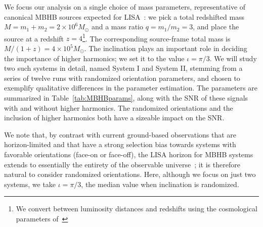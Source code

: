 \documentclass[aps,showpacs,twocolumn,prd,superscriptaddress,nofootinbib]{revtex4-1}
\begin{document}
We focus our analysis on a single choice of mass parameters, representative of canonical MBHB sources expected for LISA~\cite{Barausse12, Klein+15, LISA2017}: we pick a total redshifted mass $M=m_{1}+m_{2} = 2\times10^{6} M_{\odot}$ and a mass ratio $q=m_{1}/m_{2} = 3$, and place the source at a redshift $z=4$\footnote{We convert between luminosity distances and redshifts using the cosmological parameters of~\cite{Planck15param}}. The corresponding source-frame total mass is $M/(1+z) = 4\times10^{5} M_{\odot}$. The inclination plays an important role in deciding the importance of higher harmonics; we set it to the value $\iota = \pi/3$. We will study two such systems in detail, named System I and System II, stemming from a series of twelve runs with randomized orientation parameters, and chosen to exemplify qualitative differences in the parameter estimation. The parameters are summarized in Table~\ref{tab:MBHBparams}, along with the SNR of these signals with and without higher harmonics. The randomized orientations and the inclusion of higher harmonics both have a sizeable impact on the SNR.

We note that, by contrast with current ground-based observations that are horizon-limited and that have a strong selection bias towards systems with favorable orientations (face-on or face-off), the LISA horizon for MBHB systems extends to essentially the entirety of the observable universe~\cite{LISA2017}; it is therefore natural to consider randomized orientations. Here, although we focus on just two systems, we take $\iota = \pi/3$, the median value when inclination is randomized.
\end{document}
